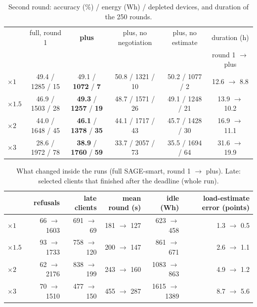 \documentclass[11pt,a4paper]{article}
\begin{document}
\begin{table}[H]
\centering
\footnotesize
\caption{Second round: accuracy (\%) / energy (Wh) / depleted devices, and
duration of the 250 rounds.}
\label{tab:wl2}
\setlength{\tabcolsep}{4pt}
\begin{tabular}{lccccc}
\toprule
& full, round 1 & \textbf{plus} & plus, no negotiation & plus, no estimate & duration (h) \\
&  &  &  &  & round 1 $\to$ plus \\
\midrule
$\times1$   & 49.4 / 1285 / 15 & 49.1 / \textbf{1072} / \textbf{7} & 50.8 / 1321 / 10 & 50.2 / 1077 / 2 & 12.6 $\to$ \phantom{0}8.8 \\
$\times1.5$ & 46.9 / 1503 / 28 & \textbf{49.3} / \textbf{1257} / \textbf{19} & 48.7 / 1571 / 26 & 49.1 / 1248 / 21 & 13.9 $\to$ 10.2 \\
$\times2$   & 44.0 / 1648 / 45 & \textbf{46.1} / \textbf{1378} / \textbf{35} & 44.1 / 1717 / 43 & 45.7 / 1428 / 30 & 16.9 $\to$ 11.1 \\
$\times3$   & 28.6 / 1972 / 78 & \textbf{38.9} / \textbf{1760} / \textbf{59} & 33.7 / 2057 / 73 & 35.5 / 1694 / 64 & 31.6 $\to$ 19.9 \\
\bottomrule
\end{tabular}
\end{table}

\begin{table}[H]
\centering
\small
\caption{What changed inside the runs (full SAGE-smart, round 1 $\to$ plus).
Late: selected clients that finished after the deadline (whole run).}
\label{tab:wl_mech}
\begin{tabular}{lrrrrr}
\toprule
& refusals & late clients & mean round (s) & idle (Wh) & load-estimate error (points) \\
\midrule
$\times1$   & \phantom{0}66 $\to$ 1603 & 691 $\to$ \phantom{0}69 & 181 $\to$ 127 & \phantom{0}623 $\to$ \phantom{0}458 & 1.3 $\to$ 0.5 \\
$\times1.5$ & \phantom{0}93 $\to$ 1733 & 758 $\to$ 120 & 200 $\to$ 147 & \phantom{0}861 $\to$ \phantom{0}671 & 2.6 $\to$ 1.1 \\
$\times2$   & \phantom{0}62 $\to$ 2176 & 838 $\to$ 199 & 243 $\to$ 160 & 1083 $\to$ \phantom{0}863 & 4.9 $\to$ 1.2 \\
$\times3$   & \phantom{0}70 $\to$ 1510 & 477 $\to$ 150 & 455 $\to$ 287 & 1615 $\to$ 1389 & 8.7 $\to$ 5.6 \\
\bottomrule
\end{tabular}
\end{table}
\end{document}
